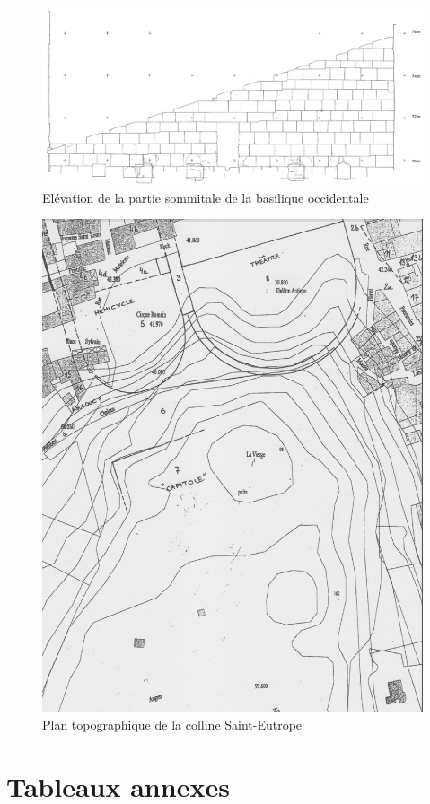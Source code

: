 \begin{figure}[!h]
	\includegraphics[height=0.8\paperheight]{images/grenierOcci}
	\caption[Elévation de la partie sommitale de la basilique occidentale]{Elévation de la partie sommitale de la basilique occidentale \cite[Pl. XLVI]{orangePl}}
	\label{grenier} 
\end{figure} 

\begin{figure}[!h]
	\includegraphics[width=\linewidth]{images/colline}
	\caption[Plan topographique de la colline Saint-Eutrope]{Plan topographique de la colline Saint-Eutrope \cite[p.11]{orangeTxt}}
	\label{colline} 
\end{figure} 		

\section{Tableaux annexes}
	\blindtext